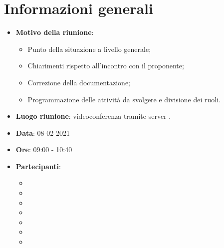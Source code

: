 \section{Informazioni generali}
\begin{itemize}
\item \textbf{Motivo della riunione}: 
\begin{itemize}
\item Punto della situazione a livello generale;
\item Chiarimenti rispetto all'incontro con il proponente;
\item Correzione della documentazione;
\item Programmazione delle attività da svolgere e divisione dei ruoli.
\end{itemize}
\item \textbf{Luogo riunione}: videoconferenza tramite server .
\item \textbf{Data}: 08-02-2021
\item \textbf{Ore}: 09:00 - 10:40
\item \textbf{Partecipanti}:
	\begin{itemize}
	\item \BM{}
	\item \SG{}
	\item \SP{}
	\item \SH{}
	\item \PA{}
	\item \ZM{}
	\item \RA{}
	\end{itemize}
\end{itemize}

\newpage

